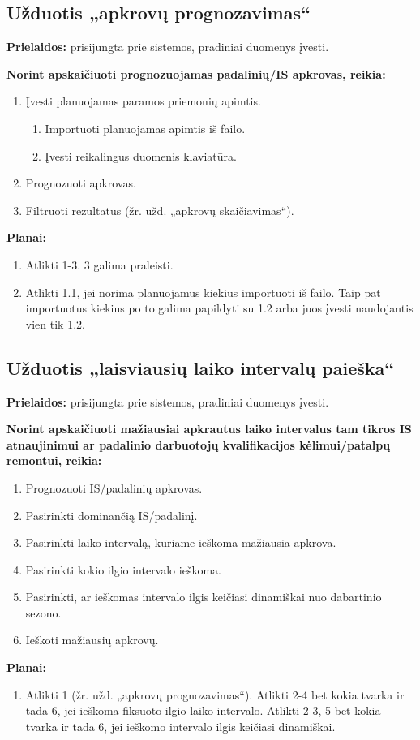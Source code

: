 \subsection{Užduotis „apkrovų prognozavimas“}

\textbf{Prielaidos:} prisijungta prie sistemos, pradiniai duomenys įvesti.

\textbf{Norint apskaičiuoti prognozuojamas padalinių/IS apkrovas, reikia:}
\begin{enumerate}
  \item Įvesti planuojamas paramos priemonių apimtis.
  \begin{enumerate}
    \item Importuoti planuojamas apimtis iš failo.
    \item Įvesti reikalingus duomenis klaviatūra.
  \end{enumerate}
  
  \item Prognozuoti apkrovas.
  \item Filtruoti rezultatus (žr. užd. „apkrovų skaičiavimas“).
\end{enumerate}

\vspace{1cm}
\textbf{Planai:}
\begin{enumerate}
  \item Atlikti 1-3. 3 galima praleisti.
  \item Atlikti 1.1, jei norima planuojamus kiekius importuoti iš failo. Taip pat importuotus
  kiekius po to galima papildyti su 1.2 arba juos įvesti naudojantis vien tik 1.2.
\end{enumerate}

\subsection{Užduotis „laisviausių laiko intervalų paieška“}

\textbf{Prielaidos:} prisijungta prie sistemos, pradiniai duomenys įvesti.

\textbf{Norint apskaičiuoti mažiausiai apkrautus laiko intervalus tam tikros IS atnaujinimui ar
padalinio darbuotojų kvalifikacijos kėlimui/patalpų remontui, reikia:}
\begin{enumerate}
  \item Prognozuoti IS/padalinių apkrovas.
  \item Pasirinkti dominančią IS/padalinį.
  \item Pasirinkti laiko intervalą, kuriame ieškoma mažiausia apkrova.
  \item Pasirinkti kokio ilgio intervalo ieškoma.
  \item Pasirinkti, ar ieškomas intervalo ilgis keičiasi dinamiškai nuo dabartinio sezono.
  \item Ieškoti mažiausių apkrovų.
\end{enumerate}

\vspace{1cm}
\textbf{Planai:}
\begin{enumerate}
  \item Atlikti 1 (žr. užd. „apkrovų prognozavimas“). Atlikti 2-4 bet kokia tvarka ir tada 6,
  jei ieškoma fiksuoto ilgio laiko intervalo. Atlikti 2-3, 5 bet kokia tvarka ir tada 6, jei
  ieškomo intervalo ilgis keičiasi dinamiškai.
\end{enumerate}
